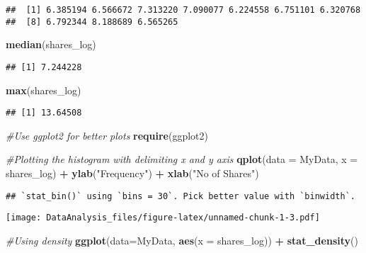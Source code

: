 \documentclass[]{article}
\newenvironment{Shaded}{\begin{snugshade}}{\end{snugshade}}
\newcommand{\KeywordTok}[1]{\textcolor[rgb]{0.13,0.29,0.53}{\textbf{#1}}}
\newcommand{\DataTypeTok}[1]{\textcolor[rgb]{0.13,0.29,0.53}{#1}}
\newcommand{\StringTok}[1]{\textcolor[rgb]{0.31,0.60,0.02}{#1}}
\newcommand{\CommentTok}[1]{\textcolor[rgb]{0.56,0.35,0.01}{\textit{#1}}}
\newcommand{\OperatorTok}[1]{\textcolor[rgb]{0.81,0.36,0.00}{\textbf{#1}}}
\newcommand{\NormalTok}[1]{#1}
\begin{document}
\begin{verbatim}
##  [1] 6.385194 6.566672 7.313220 7.090077 6.224558 6.751101 6.320768
##  [8] 6.792344 8.188689 6.565265
\end{verbatim}

\begin{Shaded}
\begin{Highlighting}[]
\KeywordTok{median}\NormalTok{(shares_log)}
\end{Highlighting}
\end{Shaded}

\begin{verbatim}
## [1] 7.244228
\end{verbatim}

\begin{Shaded}
\begin{Highlighting}[]
\KeywordTok{max}\NormalTok{(shares_log)}
\end{Highlighting}
\end{Shaded}

\begin{verbatim}
## [1] 13.64508
\end{verbatim}

\begin{Shaded}
\begin{Highlighting}[]
\CommentTok{#Use ggplot2 for better plots}
\KeywordTok{require}\NormalTok{(ggplot2)}

\CommentTok{#Plotting the histogram with delimiting x and y axis}
\KeywordTok{qplot}\NormalTok{(}\DataTypeTok{data =}\NormalTok{ MyData, }\DataTypeTok{x =}\NormalTok{ shares_log) }\OperatorTok{+}\StringTok{ }\KeywordTok{ylab}\NormalTok{(}\StringTok{"Frequency"}\NormalTok{) }\OperatorTok{+}\StringTok{ }\KeywordTok{xlab}\NormalTok{(}\StringTok{"No of Shares"}\NormalTok{)}
\end{Highlighting}
\end{Shaded}

\begin{verbatim}
## `stat_bin()` using `bins = 30`. Pick better value with `binwidth`.
\end{verbatim}

\texttt{[image: DataAnalysis\_files/figure-latex/unnamed-chunk-1-3.pdf]}

\begin{Shaded}
\begin{Highlighting}[]
\CommentTok{#Using density}
\KeywordTok{ggplot}\NormalTok{(}\DataTypeTok{data=}\NormalTok{MyData, }\KeywordTok{aes}\NormalTok{(}\DataTypeTok{x =}\NormalTok{ shares_log)) }\OperatorTok{+}\StringTok{ }\KeywordTok{stat_density}\NormalTok{()}
\end{Highlighting}
\end{Shaded}
\end{document}
